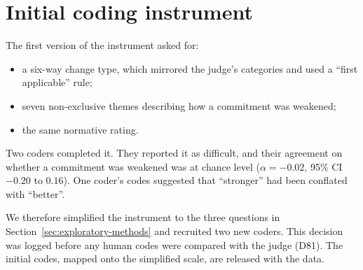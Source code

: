 \section{Initial coding instrument}
\label{app:coding-instrument}

The first version of the instrument asked for:
\begin{itemize}
\item a six-way change type, which mirrored the judge's categories and used a ``first applicable'' rule;
\item seven non-exclusive themes describing how a commitment was weakened;
\item the same normative rating.
\end{itemize}

Two coders completed it. They reported it as difficult, and their agreement on whether a commitment was weakened was at chance level ($\alpha = -0.02$, 95\% CI $-0.20$ to $0.16$). One coder's codes suggested that ``stronger'' had been conflated with ``better''.

We therefore simplified the instrument to the three questions in Section~\ref{sec:exploratory-methods} and recruited two new coders. This decision was logged before any human codes were compared with the judge (D81). The initial codes, mapped onto the simplified scale, are released with the data.
